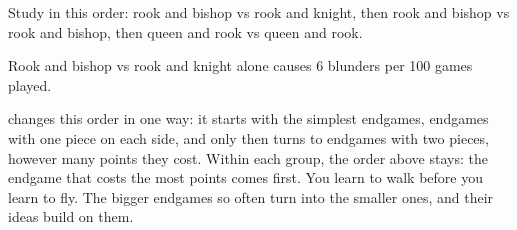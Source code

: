 \begin{keypoints}
\item Study in this order: rook and bishop vs rook and knight, then rook and bishop vs rook and bishop, then queen and rook vs queen and rook.
\item Rook and bishop vs rook and knight alone causes 6 blunders per 100 games played.
\item {} changes this order in one way: it starts with the simplest endgames, endgames with one piece on each side, and only then turns to endgames with two pieces, however many points they cost. Within each group, the order above stays: the endgame that costs the most points comes first. You learn to walk before you learn to fly. The bigger endgames so often turn into the smaller ones, and their ideas build on them.
\end{keypoints}
